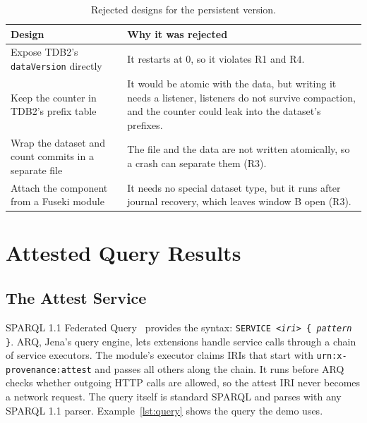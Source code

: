 \documentclass[11pt,a4paper]{article}
\newcommand{\code}[1]{\texttt{#1}}
\newcommand{\repl}[1]{\textrm{\textit{#1}}}
\begin{document}
\begin{table}[ht]
\centering
\caption{Rejected designs for the persistent version.}
\label{tab:alternatives}
\small
\begin{tabularx}{\linewidth}{@{}>{\raggedright\arraybackslash}p{48mm}>{\raggedright\arraybackslash}X@{}}
\toprule
Design & Why it was rejected \\
\midrule
Expose TDB2's \code{dataVersion} directly & It restarts at 0, so it violates R1 and R4. \\
Keep the counter in TDB2's prefix table & It would be atomic with the data, but writing it
needs a listener, listeners do not survive compaction, and the counter could leak into the
dataset's prefixes. \\
Wrap the dataset and count commits in a separate file & The file and the data are not written
atomically, so a crash can separate them (R3). \\
Attach the component from a Fuseki module & It needs no special dataset type, but it runs
after journal recovery, which leaves window B open (R3). \\
\bottomrule
\end{tabularx}
\end{table}

\section{Attested Query Results}
\label{sec:cert}

\subsection{The Attest Service}
\label{sec:service}

SPARQL 1.1 Federated Query~\cite{sparqlfed} provides the syntax:
\code{SERVICE <\repl{iri}> \{ \repl{pattern} \}}. ARQ, Jena's query engine, lets
extensions handle service calls through a chain of service executors. The module's executor
claims IRIs that start with \code{urn:x-provenance:attest} and passes all others along the
chain. It runs before ARQ checks whether outgoing HTTP calls are allowed, so the attest IRI
never becomes a network request. The query itself is standard SPARQL and parses with any SPARQL
1.1 parser. Example~\ref{lst:query} shows the query the demo uses.
\end{document}
